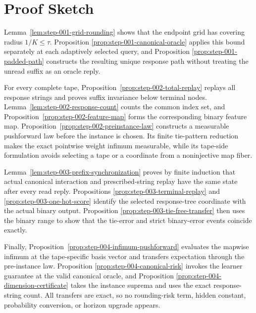\section{Proof Sketch}\label{sec:proof-sketch}

Lemma~\ref{lem:step-001-grid-rounding} shows that the endpoint grid has
covering radius \(1/K\le\tau\).  Proposition
\ref{prop:step-001-canonical-oracle} applies this bound separately at each
adaptively selected query, and Proposition
\ref{prop:step-001-padded-path} constructs the resulting unique response
path without treating the unread suffix as an oracle reply.

For every complete tape, Proposition~\ref{prop:step-002-total-replay}
replays all response strings and proves suffix invariance below terminal
nodes.  Lemma~\ref{lem:step-002-response-count} counts the common index set,
and Proposition~\ref{prop:step-002-feature-map} forms the corresponding
binary feature map.  Proposition~\ref{prop:step-002-preinstance-law}
constructs a measurable pushforward law before the instance is chosen.  Its
finite tie-pattern reduction makes the exact pointwise weight infimum
measurable, while its tape-side formulation avoids selecting a tape or a
coordinate from a noninjective map fiber.

Lemma~\ref{lem:step-003-prefix-synchronization} proves by finite induction
that actual canonical interaction and prescribed-string replay have the same
state after every read reply.  Propositions
\ref{prop:step-003-terminal-replay} and
\ref{prop:step-003-one-hot-score} identify the selected response-tree
coordinate with the actual binary output.  Proposition
\ref{prop:step-003-tie-free-transfer} then uses the binary range to show
that the tie-error and strict binary-error events coincide exactly.

Finally, Proposition~\ref{prop:step-004-infimum-pushforward} evaluates the
mapwise infimum at the tape-specific basis vector and transfers expectation
through the pre-instance law.  Proposition
\ref{prop:step-004-canonical-risk} invokes the learner guarantee at the
valid canonical oracle, and Proposition
\ref{prop:step-004-dimension-certificate} takes the instance suprema and
uses the exact response-string count.  All transfers are exact, so no
rounding-risk term, hidden constant, probability conversion, or horizon
upgrade appears.
